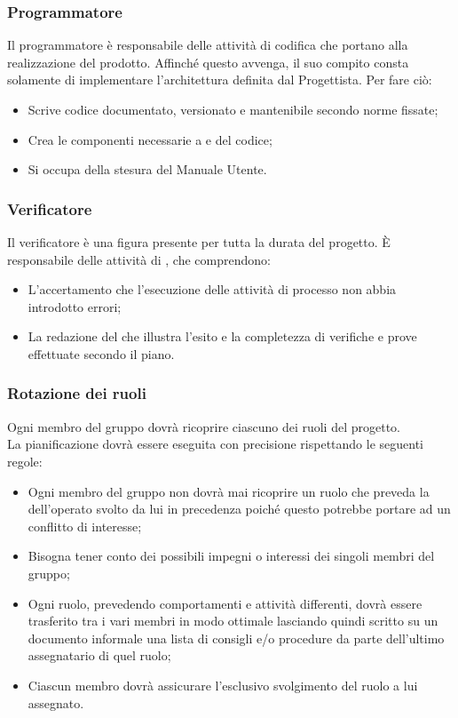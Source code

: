 \documentclass[NormeDiProgetto.tex]{subfiles}
\begin{document}
	\subsubsection{Programmatore}
	Il programmatore è responsabile delle attività di codifica che portano alla realizzazione del prodotto. Affinché questo avvenga, il suo compito consta solamente di implementare l'architettura definita dal Progettista. Per fare ciò:
	\begin{itemize}
		\item Scrive codice documentato, versionato e mantenibile secondo norme fissate;
		\item Crea le componenti necessarie a  e  del codice;
		\item Si occupa della stesura del Manuale Utente.
	\end{itemize}

	\subsubsection{Verificatore}
	Il verificatore è una figura presente per tutta la durata del progetto. \`{E} responsabile delle attività di , che comprendono:
	\begin{itemize}
	\item L'accertamento che l'esecuzione delle attività di processo non abbia introdotto errori;
	\item La redazione del \pdq che illustra l'esito e la completezza di verifiche e prove effettuate secondo il piano.
	\end{itemize}
	
	\subsubsection{Rotazione dei ruoli}
	Ogni membro del gruppo dovrà ricoprire ciascuno dei ruoli del progetto.\\
	La pianificazione dovrà essere eseguita con precisione rispettando le seguenti regole:
	\begin{itemize}
		\item Ogni membro del gruppo non dovrà mai ricoprire un ruolo che preveda la  dell'operato svolto da lui in precedenza poiché questo potrebbe	portare ad un conflitto di interesse;
		\item Bisogna tener conto dei possibili impegni o interessi dei singoli membri del gruppo;
		\item Ogni ruolo, prevedendo comportamenti e attività differenti, dovrà essere trasferito tra i vari membri in modo ottimale lasciando quindi scritto su un documento informale una lista di consigli e/o procedure da parte dell'ultimo assegnatario di quel ruolo;
		\item Ciascun membro dovrà assicurare l'esclusivo svolgimento del ruolo a lui assegnato.
	\end{itemize}
	
\end{document}
